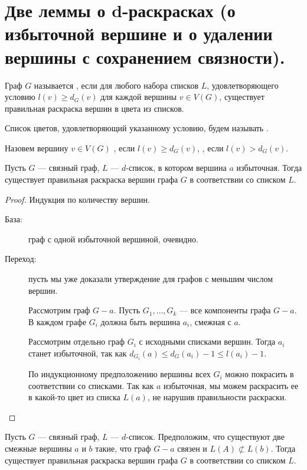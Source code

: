 \section{Две леммы о d-раскрасках (о избыточной вершине и о удалении вершины с сохранением связности).}

\begin{definition}
    Граф $G$ называется , если для любого набора списков $L$, удовлетворяющего условию $l(v) \ge d_G(v)$ для каждой вершины $v \in V(G)$, существует правильная раскраска вершин в цвета из списков.

	Список цветов, удовлетворяющий указанному  условию, будем называть .
\end{definition}

\begin{definition}
    Назовем вершину $v \in V(G)$ , если $l(v) \ge d_G(v)$, , если $l(v) > d_{G}(v)$.
\end{definition}

\begin{lemma}\label{lm:coloring_5}
	Пусть $ G$ --- связный граф, $L$ --- $d$-список, в котором вершина $a$ избыточная. Тогда существует правильная раскраска вершин графа $G$ в соответствии со списком $L$. 
\end{lemma}
\begin{proof}
    Индукция по количеству вершин.
	\begin{description}
		\item [База:] граф с одной избыточной вершиной, очевидно.
		\item [Переход:]  пусть мы уже доказали утверждение для графов с меньшим числом вершин.

			Рассмотрим граф $G-a$. Пусть $G_1, \ldots , G_k$ --- все компоненты графа $G-a$. В каждом графе $G_i$ должна быть вершина $a_i$, смежная с $a$.

			Рассмотрим отдельно граф $G_i$ с исходными списками вершин. Тогда $a_i$ станет избыточной, так как $d_{G_i}(a) \le d_G(a_i) - 1 \le l(a_i) - 1$.

			По индукционному предположению вершины всех $G_i$ можно покрасить в соответствии со списками. Так как $a$ избыточная, мы можем раскрасить ее в какой-то цвет из списка $L(a)$, не нарушив правильности раскраски. 
	\end{description}
\end{proof}

\begin{lemma}\label{lm:coloring_6}
	Пусть $G$ --- связный граф, $L$ --- $d$-список. Предположим, что существуют две смежные вершины $a$ и $b$ такие, что граф $G-a$ связен и $L(A) \not\subset L(b)$. Тогда существует правильная раскраска вершин графа $G$ в соответствии со списком $L$.
\end{lemma}

